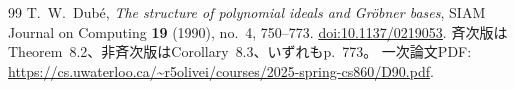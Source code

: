 \documentclass[a4paper,11pt]{ltjsarticle}
\theoremstyle{definition}
\begin{document}
\begin{thebibliography}{99}
T.~W.~Dub\'e,
\emph{The structure of polynomial ideals and Gr\"obner bases},
SIAM Journal on Computing \textbf{19} (1990), no.~4, 750--773.
\href{https://doi.org/10.1137/0219053}{doi:10.1137/0219053}.
斉次版はTheorem~8.2、非斉次版はCorollary~8.3、いずれもp.~773。
一次論文PDF:
\url{https://cs.uwaterloo.ca/~r5olivei/courses/2025-spring-cs860/D90.pdf}.

\end{thebibliography}
\end{document}
